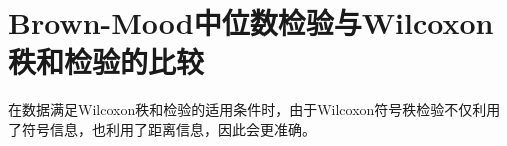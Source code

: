 \section{Brown-Mood中位数检验与Wilcoxon秩和检验的比较}
在数据满足Wilcoxon秩和检验的适用条件时，由于Wilcoxon符号秩检验不仅利用了符号信息，也利用了距离信息，因此会更准确。